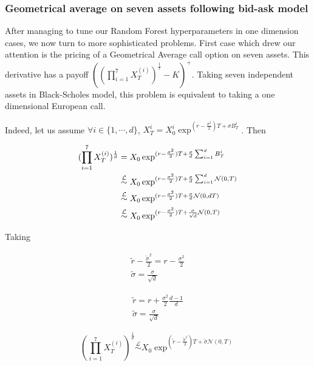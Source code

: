 \documentclass[english,11pt,openany]{article}
\theoremstyle{definition}
\theoremstyle{plain}
\theoremstyle{definition}
\begin{document}
	\subsubsection{Geometrical average on seven assets following bid-ask model}
	
	After managing to tune our Random Forest hyperparameters in one dimension cases, we now turn to more sophisticated problems. 
	First case which drew our attention is the pricing of a Geometrical Average call option on seven assets. This derivative has a payoff $((\prod_{i=1}^{7}X_T^{(i)})^{\frac{1}{7}} - K)^+$. 
	Taking seven independent assets in Black-Scholes model, this problem is equivalent to taking a one dimensional European call. 
	
	Indeed, let us assume $\forall i \in \{1, \cdots, d\}$, $X_T^{i} = X_0^{i} \exp^{(r - \frac{\sigma^2}{2})T + \sigma B_T^{i}}$. 
	Then 
	
	\begin{align}
	(\prod_{i=1}^{7}X_T^{(i)})^{\frac{1}{d}} &= X_0 \exp^{(r - \frac{\sigma^2}{2})T + \frac{\sigma}{d}\sum_{i=1}^{d}B_T^{i}} \notag \\
	&\overset{\mathcal{L}}{\sim} X_0 \exp^{(r - \frac{\sigma^2}{2})T + \frac{\sigma}{d}\sum_{i=1}^{d}\mathcal{N}(0, T)} \notag \\
	&\overset{\mathcal{L}}{\sim} X_0 \exp^{(r - \frac{\sigma^2}{2})T + \frac{\sigma}{d}\mathcal{N}(0, dT)} \notag \\
	&\overset{\mathcal{L}}{\sim} X_0 \exp^{(r - \frac{\sigma^2}{2})T + \frac{\sigma}{\sqrt{d}}\mathcal{N}(0, T)} \notag
	\end{align}
	
	Taking 
	
	\begin{align}
	\tilde{r} - \frac{\tilde{\sigma}^2}{2} = r - \frac{\sigma^2}{2} \\
	\tilde{\sigma} = \frac{\sigma}{\sqrt{d}}
	\end{align}
	
	\begin{align}
	\tilde{r} = r + \frac{\sigma^2}{2}\frac{d-1}{d} \\
	\tilde{\sigma} = \frac{\sigma}{\sqrt{d}}
	\end{align}
	
	\begin{displaymath}
	(\prod_{i=1}^{7}X_T^{(i)})^{\frac{1}{d}} \overset{\mathcal{L}}{\sim} X_0 \exp^{(\tilde{r} - \frac{\tilde{\sigma}^2}{2})T + \tilde{\sigma}\mathcal{N}(0, T)}
	\end{displaymath}
	
\end{document}
